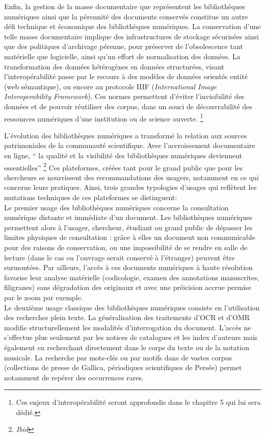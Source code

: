 Enfin, la gestion de la masse documentaire que représentent les bibliothèques numériques ainsi que la pérennité des documents conservés constitue un autre défi technique et économique des bibliothèques numériques. La conservation d’une telle masse documentaire implique des infrastructures de stockage sécurisées ainsi que des politiques d’archivage pérenne, pour préserver de l’obsolescence tant matérielle que logicielle, ainsi qu’un effort de normalisation des données. 
La transformation des données hétérogènes en données structurées, visant l’interopérabilité  passe par le recours à des modèles de données orientés entité (web sémantique), ou encore au protocole IIIF (\textit{International Image Interoperability Framework}). Ces normes permettent d’éviter l’invisibilité des données et de pouvoir réutiliser des corpus, dans un souci de découvrabilité des ressources numériques d’une institution ou de science ouverte. \footnote{Ces enjeux d’interopérabilité seront approfondis dans le chapitre 5 qui lui sera dédié.}

L'évolution des bibliothèques numériques a transformé la relation aux sources patrimoniales de la communauté scientifique. 
Avec l’accroissement documentaire en ligne, “ la qualité et la visibilité des bibliothèques numériques deviennent essentielles” \footnote {\textit{Ibid}}
Ces plateformes, créées tant pour le grand public que pour les chercheurs se nourrissent des recommandations des usagers, notamment en ce qui concerne leurs pratiques. Ainsi, trois grandes typologies d'usages qui reflètent les mutations techniques de ces plateformes se distinguent:\\

Le premier usage des bibliothèques numériques concerne la consultation numérique distante et immédiate d'un document. Les bibliothèques numériques permettent alors à l'usager, chercheur, étudiant ou grand public de dépasser les limites physiques de consultation : grâce à elles un document non communicable pour des raisons de conservation, ou une impossibilité de se rendre en salle de lecture (dans le cas ou l'ouvrage serait conservé à l'étranger) peuvent être surmontées. Par ailleurs, l'accès à ces documents numériques à haute résolution favorise leur analyse matérielle (codicologie, examen des annotations manuscrites, filigranes) sans dégradation des originaux et avec une préicision accrue permise par le zoom par exemple.\\

Le deuxième usage classique des bibliothèques numériques consiste en l'utilisation des recherches plein texte.
La généralisation des traitements d'OCR et d'OMR modifie structurellement les modalités d'interrogation du document. L'accès ne s'effectue plus seulement par les notices de catalogues et les index d'auteurs mais également en recherchant directement dans le corps du texte ou de la notation musicale. La recherche par mots-clés ou par motifs dans de vastes corpus (collections de presse de Gallica, périodiques scientifiques de Persée) permet notamment de repérer des occurrences rares. \\

